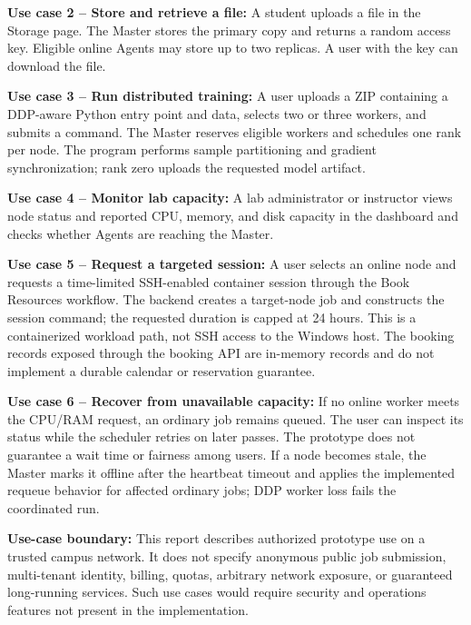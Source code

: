 \documentclass{article}
\begin{document}
\textbf{Use case 2 -- Store and retrieve a file:} A student uploads a file in the Storage page. The Master stores the primary copy and returns a random access key. Eligible online Agents may store up to two replicas. A user with the key can download the file.

\textbf{Use case 3 -- Run distributed training:} A user uploads a ZIP containing a DDP-aware Python entry point and data, selects two or three workers, and submits a command. The Master reserves eligible workers and schedules one rank per node. The program performs sample partitioning and gradient synchronization; rank zero uploads the requested model artifact.

\textbf{Use case 4 -- Monitor lab capacity:} A lab administrator or instructor views node status and reported CPU, memory, and disk capacity in the dashboard and checks whether Agents are reaching the Master.

\textbf{Use case 5 -- Request a targeted session:} A user selects an online node and requests a time-limited SSH-enabled container session through the Book Resources workflow. The backend creates a target-node job and constructs the session command; the requested duration is capped at 24 hours. This is a containerized workload path, not SSH access to the Windows host. The booking records exposed through the booking API are in-memory records and do not implement a durable calendar or reservation guarantee.

\textbf{Use case 6 -- Recover from unavailable capacity:} If no online worker meets the CPU/RAM request, an ordinary job remains queued. The user can inspect its status while the scheduler retries on later passes. The prototype does not guarantee a wait time or fairness among users. If a node becomes stale, the Master marks it offline after the heartbeat timeout and applies the implemented requeue behavior for affected ordinary jobs; DDP worker loss fails the coordinated run.

\textbf{Use-case boundary:} This report describes authorized prototype use on a trusted campus network. It does not specify anonymous public job submission, multi-tenant identity, billing, quotas, arbitrary network exposure, or guaranteed long-running services. Such use cases would require security and operations features not present in the implementation.
	\pagebreak
\end{document}
